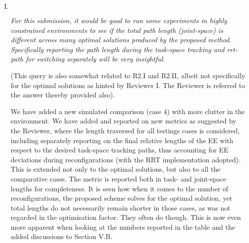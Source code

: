 \documentclass[11pt]{article}
\newenvironment{reviewer}
{\begin{mdframed}[roundcorner = 10pt,fontcolor=blue!70!black]\itshape}
{\end{mdframed}}
\begin{document}
\begin{enumerate}[I.]
\begin{comment}
\begin{color}{red}
I think both your words and mine are required. When seeing ``\textit{the proposed solution does not account for the path taken by the RRT during the switches}", I thought the same as you, i.e., reviewer 1 asked about whether there is a non-min-reconfiguration solution with a faster execution time, the same as reviewer 2.1. But then he said ``\textit{For this submission, it would be good to ... to see if the total path length (joint-space) is different across many optimal solutions ...}", where he was indicating a comparison between optimal solutions. This is why I reported two instances of "ours" in case 2 and case 4 in Table 2. Though not a critical issue from the reviewer, I think we should mention ``we have done this". 
\end{color}
\end{comment}

 \item $ $
  \begin{reviewer}
   For this submission, it would be good to run some experiments in highly constrained environments to see if the total path length (joint-space) is different across many optimal solutions produced by the proposed method.
Specifically reporting the path length during the task-space tracking and rrt-path for switching separately will be very insightful. 
  \end{reviewer}

(This query is also somewhat related to R2.I and R2.II, albeit not specifically for the optimal solutions as hinted by Reviewer I. The Reviewer is referred to the answer thereby provided also).

We have added a new simulated comparison (case 4) with more clutter in the environment. We have added and reported on new metrics as suggested by the Reviewer, where the length traversed for all testings cases is considered, including separately reporting on the final relative lengths of the  EE with respect to the desired task-space tracking paths, thus accounting for EE deviations during reconfigurations (with the RRT implementation adopted). This is extended not only to the optimal solutions, but also to all the comparative cases.
The metric is reported both in task- and joint-space lengths for completeness. It is seen how when it comes to the number of reconfigurations, the proposed scheme solves for the optimal solution, yet total lengths do not necessarily remain shorter in those cases, as was not regarded in the optimisation factor. They often do though. 
This is now even more apparent when looking at the numbers reported in the table and the added discussions to Section V.B. 


\end{enumerate}
\end{document}
